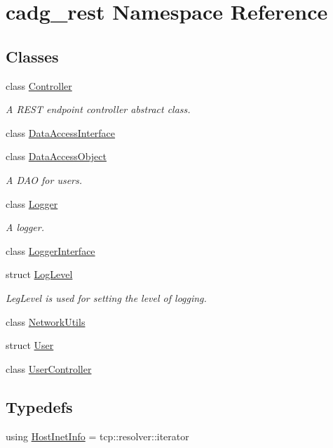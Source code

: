 \hypertarget{namespacecadg__rest}{}\section{cadg\+\_\+rest Namespace Reference}
\label{namespacecadg__rest}
\subsection*{Classes}
\begin{DoxyCompactItemize}
\item 
class \mbox{\hyperlink{classcadg__rest_1_1_controller}{Controller}}
\begin{DoxyCompactList}\small\item\em A R\+E\+ST endpoint controller abstract class. \end{DoxyCompactList}\item 
class \mbox{\hyperlink{classcadg__rest_1_1_data_access_interface}{Data\+Access\+Interface}}
\item 
class \mbox{\hyperlink{classcadg__rest_1_1_data_access_object}{Data\+Access\+Object}}
\begin{DoxyCompactList}\small\item\em A D\+AO for users. \end{DoxyCompactList}\item 
class \mbox{\hyperlink{classcadg__rest_1_1_logger}{Logger}}
\begin{DoxyCompactList}\small\item\em A logger. \end{DoxyCompactList}\item 
class \mbox{\hyperlink{classcadg__rest_1_1_logger_interface}{Logger\+Interface}}
\item 
struct \mbox{\hyperlink{structcadg__rest_1_1_log_level}{Log\+Level}}
\begin{DoxyCompactList}\small\item\em Leg\+Level is used for setting the level of logging. \end{DoxyCompactList}\item 
class \mbox{\hyperlink{classcadg__rest_1_1_network_utils}{Network\+Utils}}
\item 
struct \mbox{\hyperlink{structcadg__rest_1_1_user}{User}}
\item 
class \mbox{\hyperlink{classcadg__rest_1_1_user_controller}{User\+Controller}}
\end{DoxyCompactItemize}
\subsection*{Typedefs}
\begin{DoxyCompactItemize}
\item 
using \mbox{\hyperlink{namespacecadg__rest_a482207a93eaafbda9ea2db9247aa78c9}{Host\+Inet\+Info}} = tcp\+::resolver\+::iterator
\end{DoxyCompactItemize}
